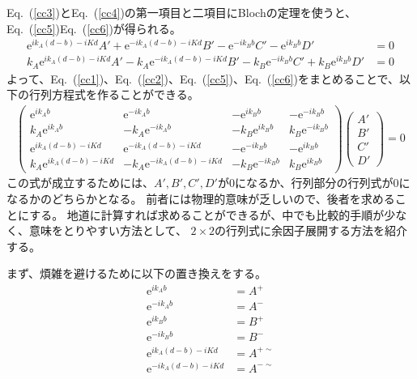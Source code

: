 \documentclass[autodetect-engine,dvipdfmx-if-dvi,ja=standard,a4paper,layout=v2]{bxjsreport}
\newcommand{\eref}[1]{Eq.~(\ref{#1})}
\begin{document}
    \eref{cc3}と\eref{cc4}の第一項目と二項目にBlochの定理を使うと、\eref{cc5}\eref{cc6}が得られる。
    \begin{align}
    \mathrm{e}^{ik_A(d-b)-iKd}A'+\mathrm{e}^{-ik_A(d-b)-iKd}B'-\mathrm{e}^{-ik_Bb}C'-\mathrm{e}^{ik_Bb}D'&=0\label{cc5}\\
    k_A\mathrm{e}^{ik_A(d-b)-iKd}A'-k_A\mathrm{e}^{-ik_A(d-b)-iKd}B'-k_B\mathrm{e}^{-ik_Bb}C'+k_B\mathrm{e}^{ik_Bb}D'&=0\label{cc6}
    \end{align}
    よって、\eref{cc1}、\eref{cc2}、\eref{cc5}、\eref{cc6}をまとめることで、以下の行列方程式を作ることができる。
    \begin{align}
    \begin{pmatrix}
    \mathrm{e}^{ik_Ab}&\mathrm{e}^{-ik_Ab}&-\mathrm{e}^{ik_Bb}&-\mathrm{e}^{-ik_Bb}\\
    k_A\mathrm{e}^{ik_Ab}&-k_A\mathrm{e}^{-ik_Ab}&-k_B\mathrm{e}^{ik_Bb}&k_B\mathrm{e}^{-ik_Bb}\\
    \mathrm{e}^{ik_A(d-b)-iKd}&\mathrm{e}^{-ik_A(d-b)-iKd}&-\mathrm{e}^{-ik_Bb}&-\mathrm{e}^{ik_Bb}\\
    k_A\mathrm{e}^{ik_A(d-b)-iKd}&-k_A\mathrm{e}^{-ik_A(d-b)-iKd}&-k_B\mathrm{e}^{-ik_Bb}&k_B\mathrm{e}^{ik_Bb}
    \end{pmatrix}
    \begin{pmatrix}
    A'\\
    B'\\
    C'\\
    D'
    \end{pmatrix}=0
    \end{align}
    この式が成立するためには、$A',B',C',D'$が0になるか、行列部分の行列式が0になるかのどちらかとなる。
    前者には物理的意味が乏しいので、後者を求めることにする。
    地道に計算すれば求めることができるが、中でも比較的手順が少なく、意味をとりやすい方法として、
    $2\times2$の行列式に余因子展開する方法を紹介する。\par
    まず、煩雑を避けるために以下の置き換えをする。
    \begin{align}
    \mathrm{e}^{ik_Ab}&=A^+\nonumber\\
    \mathrm{e}^{-ik_Ab}&=A^-\nonumber\\
    \mathrm{e}^{ik_Bb}&=B^+\nonumber\\
    \mathrm{e}^{-ik_Bb}&=B^-\nonumber\\
    \mathrm{e}^{ik_A(d-b)-iKd}&=A^{+\sim}\nonumber\\
    \mathrm{e}^{-ik_A(d-b)-iKd}&=A^{-\sim}\nonumber
    \end{align}
\end{document}
